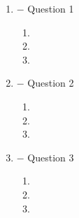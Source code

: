 \documentclass[12pt]{article}
\begin{document}
\begin{enumerate}

  \item $-$ Question 1

    \begin{enumerate}

      \item 

      \item 

      \item 

    \end{enumerate}

    \newpage

  \item $-$ Question 2

    \begin{enumerate}

      \item 

      \item 

      \item 

    \end{enumerate}

    \newpage

  \item $-$ Question 3

    \begin{enumerate}

      \item 

      \item 

      \item 

    \end{enumerate}

\end{enumerate}
\end{document}
